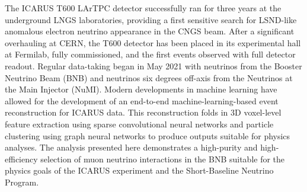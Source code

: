 The ICARUS T600 LArTPC detector successfully ran for three years at the underground LNGS laboratories, providing a first sensitive search for LSND-like anomalous electron neutrino appearance in the CNGS beam. After a significant overhauling at CERN, the T600 detector has been placed in its experimental hall at Fermilab, fully commissioned, and the first events observed with full detector readout. Regular data-taking began in May 2021 with neutrinos from the Booster Neutrino Beam (BNB) and neutrinos six degrees off-axis from the Neutrinos at the Main Injector (NuMI). Modern developments in machine learning have allowed for the development of an end-to-end machine-learning-based event reconstruction for ICARUS data. This reconstruction folds in 3D voxel-level feature extraction using sparse convolutional neural networks and particle clustering using graph neural networks to produce outputs suitable for physics analyses. The analysis presented here demonstrates a high-purity and high-efficiency selection of muon neutrino interactions in the BNB suitable for the physics goals of the ICARUS experiment and the Short-Baseline Neutrino Program.